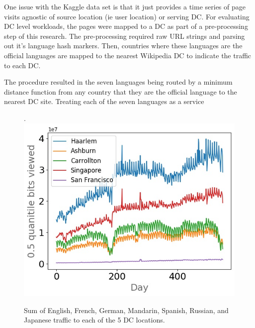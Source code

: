 One issue with the Kaggle data set is that it just provides a time series of page visits agnostic of source location (ie user location) or serving DC. For evaluating DC level workloads, the pages were mapped to a DC  as part of a pre-processing step of this research. The pre-processing required  raw URL strings and parsing out it's language hash markers. Then, countries where these languages are the official languages are mapped to the nearest Wikipedia DC to indicate the traffic to each DC. 



The procedure resulted in the seven languages being routed by a minimum distance function from any country that they are the official language to the nearest DC site. Treating each of the seven languages as a service  

\begin{figure}.
\centering
\includegraphics[scale=0.45]{building_energy_model/img/lang2dc_curve.jpg}
\caption[DC traffic with all languages summed]{Sum of English, French, German, Mandarin, Spanish, Russian, and Japanese traffic to each of the 5 DC locations.}
\label{fig:lang2dc}
\end{figure}

